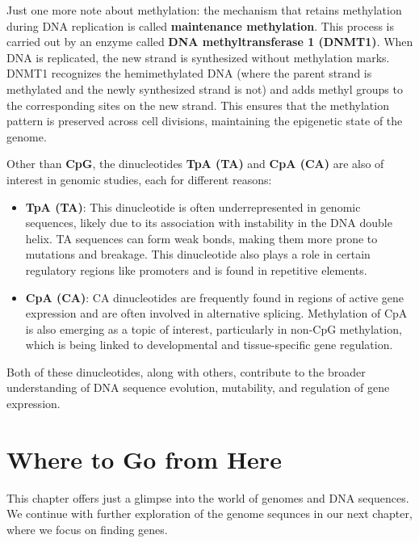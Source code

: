 Just one more note about methylation: the mechanism that retains methylation during DNA replication is called {\bf maintenance methylation}. This process is carried out by an enzyme called {\bf DNA methyltransferase 1 (DNMT1)}. When DNA is replicated, the new strand is synthesized without methylation marks. DNMT1 recognizes the hemimethylated DNA (where the parent strand is methylated and the newly synthesized strand is not) and adds methyl groups to the corresponding sites on the new strand. This ensures that the methylation pattern is preserved across cell divisions, maintaining the epigenetic state of the genome.

Other than \textbf{CpG}, the dinucleotides \textbf{TpA (TA)} and \textbf{CpA (CA)} are also of interest in genomic studies, each for different reasons:

\begin{itemize}
    \item \textbf{TpA (TA)}: This dinucleotide is often underrepresented in genomic sequences, likely due to its association with instability in the DNA double helix. TA sequences can form weak bonds, making them more prone to mutations and breakage. This dinucleotide also plays a role in certain regulatory regions like promoters and is found in repetitive elements.
    
    \item \textbf{CpA (CA)}: CA dinucleotides are frequently found in regions of active gene expression and are often involved in alternative splicing. Methylation of CpA is also emerging as a topic of interest, particularly in non-CpG methylation, which is being linked to developmental and tissue-specific gene regulation.
\end{itemize}

Both of these dinucleotides, along with others, contribute to the broader understanding of DNA sequence evolution, mutability, and regulation of gene expression.

\section{Where to Go from Here}

This chapter offers just a glimpse into the world of genomes and DNA sequences. We continue with further exploration of the genome sequnces in our next chapter, where we focus on finding genes.
